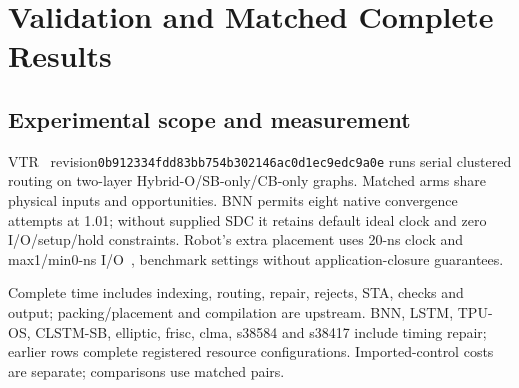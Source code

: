 \documentclass[conference,10pt]{IEEEtran}
\begin{document}
\section{Validation and Matched Complete Results}
\subsection{Experimental scope and measurement}
VTR~\cite{vtr9paper} revision\newline\texttt{0b912334fdd83bb754b302146ac0d1ec9edc9a0e} runs serial clustered routing on two-layer Hybrid-O/SB-only/CB-only graphs. Matched arms share physical inputs and opportunities. BNN permits eight native convergence attempts at 1.01; without supplied SDC it retains default ideal clock and zero I/O/setup/hold constraints. Robot's extra placement uses 20-ns clock and max1/min0-ns I/O~\cite{vprsdc}, benchmark settings without application-closure guarantees.

Complete time includes indexing, routing, repair, rejects, STA, checks and output; packing/placement and compilation are upstream. BNN, LSTM, TPU-OS, CLSTM-SB, elliptic, frisc, clma, s38584 and s38417 include timing repair; earlier rows complete registered resource configurations. Imported-control costs are separate; comparisons use matched pairs.
\end{document}
